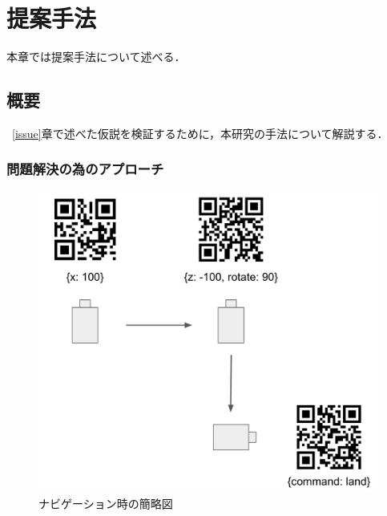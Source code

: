 \chapter{提案手法}
\label{proposed}

本章では提案手法について述べる．

\section{概要}
~\ref{issue}章で述べた仮説を検証するために，本研究の手法について解説する．

\subsection{問題解決の為のアプローチ}

\begin{figure}[htbp]
  \begin{center}
    \includegraphics[clip,width=15.0cm]{img/flow.png}
    \caption{ナビゲーション時の簡略図}
    \label{flow_sample}
  \end{center}
\end{figure}


